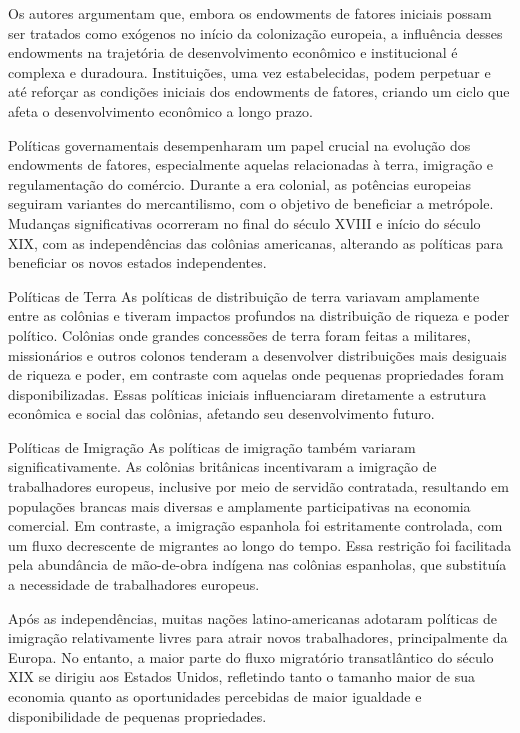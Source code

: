 \documentclass[a4paper,12pt]{article}[abntex2]
\begin{document}
Os autores argumentam que, embora os endowments de fatores iniciais possam ser tratados como exógenos no início da colonização europeia, a influência desses endowments na trajetória de desenvolvimento econômico e institucional é complexa e duradoura. Instituições, uma vez estabelecidas, podem perpetuar e até reforçar as condições iniciais dos endowments de fatores, criando um ciclo que afeta o desenvolvimento econômico a longo prazo.

Políticas governamentais desempenharam um papel crucial na evolução dos endowments de fatores, especialmente aquelas relacionadas à terra, imigração e regulamentação do comércio. Durante a era colonial, as potências europeias seguiram variantes do mercantilismo, com o objetivo de beneficiar a metrópole. Mudanças significativas ocorreram no final do século XVIII e início do século XIX, com as independências das colônias americanas, alterando as políticas para beneficiar os novos estados independentes.

Políticas de Terra
As políticas de distribuição de terra variavam amplamente entre as colônias e tiveram impactos profundos na distribuição de riqueza e poder político. Colônias onde grandes concessões de terra foram feitas a militares, missionários e outros colonos tenderam a desenvolver distribuições mais desiguais de riqueza e poder, em contraste com aquelas onde pequenas propriedades foram disponibilizadas. Essas políticas iniciais influenciaram diretamente a estrutura econômica e social das colônias, afetando seu desenvolvimento futuro.

Políticas de Imigração
As políticas de imigração também variaram significativamente. As colônias britânicas incentivaram a imigração de trabalhadores europeus, inclusive por meio de servidão contratada, resultando em populações brancas mais diversas e amplamente participativas na economia comercial. Em contraste, a imigração espanhola foi estritamente controlada, com um fluxo decrescente de migrantes ao longo do tempo. Essa restrição foi facilitada pela abundância de mão-de-obra indígena nas colônias espanholas, que substituía a necessidade de trabalhadores europeus.

Após as independências, muitas nações latino-americanas adotaram políticas de imigração relativamente livres para atrair novos trabalhadores, principalmente da Europa. No entanto, a maior parte do fluxo migratório transatlântico do século XIX se dirigiu aos Estados Unidos, refletindo tanto o tamanho maior de sua economia quanto as oportunidades percebidas de maior igualdade e disponibilidade de pequenas propriedades.
\end{document}
